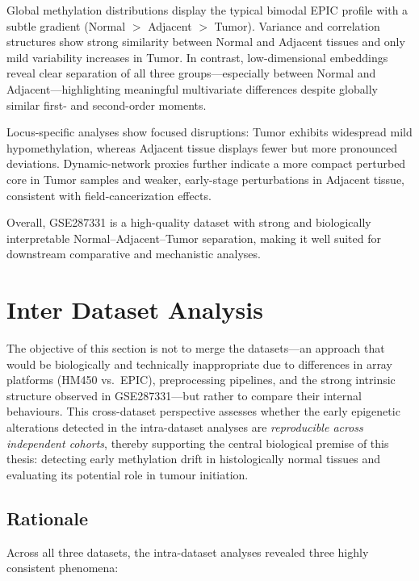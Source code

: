 \documentclass[10pt]{extarticle}
\begin{document}
Global methylation distributions display the typical bimodal EPIC profile with a subtle 
gradient (Normal $>$ Adjacent $>$ Tumor). Variance and correlation structures show strong 
similarity between Normal and Adjacent tissues and only mild variability increases in 
Tumor. In contrast, low-dimensional embeddings reveal clear separation of all three 
groups—especially between Normal and Adjacent—highlighting meaningful multivariate 
differences despite globally similar first- and second-order moments.

Locus-specific analyses show focused disruptions: Tumor exhibits widespread mild 
hypomethylation, whereas Adjacent tissue displays fewer but more pronounced deviations. 
Dynamic-network proxies further indicate a more compact perturbed core in Tumor samples 
and weaker, early-stage perturbations in Adjacent tissue, consistent with 
field-cancerization effects.

Overall, GSE287331 is a high-quality dataset with strong and biologically interpretable 
Normal–Adjacent–Tumor separation, making it well suited for downstream comparative and 
mechanistic analyses.


\section{Inter Dataset Analysis}
\label{sec:inter_dataset}

The objective of this section is not to merge the datasets---an approach that would be biologically and technically 
inappropriate due to differences in array platforms (HM450 vs.\ EPIC), preprocessing pipelines, and the strong 
intrinsic structure observed in GSE287331---but rather to compare their internal behaviours. 
This cross-dataset perspective assesses whether the early epigenetic alterations detected in the intra-dataset 
analyses are \emph{reproducible across independent cohorts}, thereby supporting the central biological premise 
of this thesis: detecting early methylation drift in histologically normal tissues and evaluating its potential 
role in tumour initiation.

\subsection{Rationale}

Across all three datasets, the intra-dataset analyses revealed three highly consistent phenomena:
\end{document}
